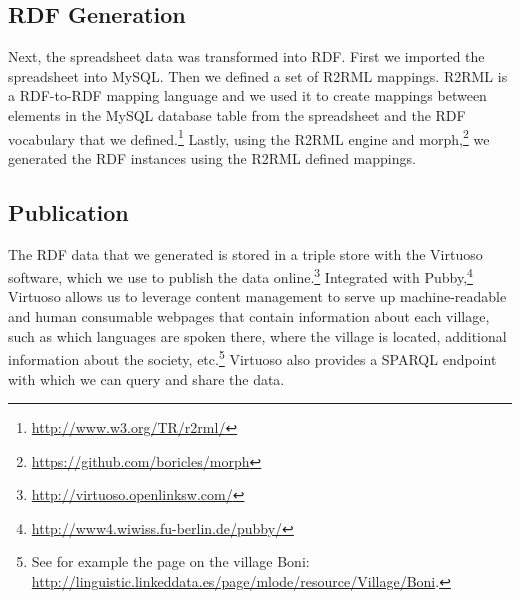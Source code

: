 \subsection{RDF Generation}
Next, the spreadsheet data was transformed into RDF. First we imported the spreadsheet into MySQL. Then we defined a set of R2RML mappings. R2RML is a RDF-to-RDF mapping language and we used it to create mappings between elements in the MySQL database table from the spreadsheet and the RDF vocabulary that we defined.\footnote{\url{http://www.w3.org/TR/r2rml/}} Lastly, using the R2RML engine and morph,\footnote{\url{https://github.com/boricles/morph}} we generated the RDF instances using the R2RML defined mappings.

\subsection{Publication}\label{sec:pub}
The RDF data that we generated is stored in a triple store with the Virtuoso software, which we use to publish the data online.\footnote{\url{http://virtuoso.openlinksw.com/}} Integrated with Pubby,\footnote{\url{http://www4.wiwiss.fu-berlin.de/pubby/}} Virtuoso allows us to leverage content management to serve up machine-readable and human consumable webpages that contain information about each village, such as which languages are spoken there, where the village is located, additional information about the society, etc.\footnote{See for example the page on the village Boni: \url{http://linguistic.linkeddata.es/page/mlode/resource/Village/Boni}.} Virtuoso also provides a SPARQL endpoint with which we can query and share the data.



